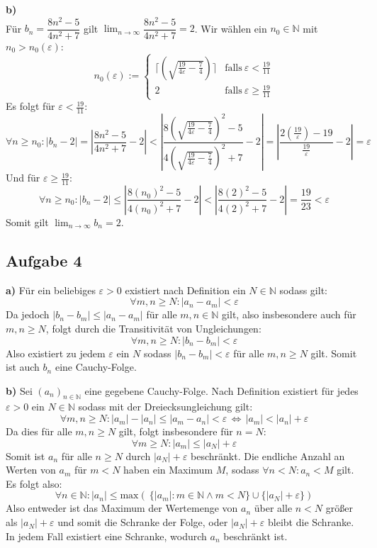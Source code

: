 \documentclass[a4paper,graphics,11pt]{article}
\newcommand{\aufgabe}[1]{\subsection*{Aufgabe #1}}
\begin{document}
\textbf{b)}\\
Für $b_n=\dfrac{8n^2-5}{4n^2+7}$ gilt $\lim_{n \to\infty}\limits \dfrac{8n^2-5}{4n^2+7}=2$.
Wir wählen ein $n_0 \in \mathbb{N}$ mit $n_0 > n_0(\varepsilon)$:
$$
    n_0(\varepsilon) := \begin{cases}
        \Big\lceil\left(\sqrt{\frac{19}{4\varepsilon} - \frac{7}{4}}\right)\Big\rceil
            & \text{falls}\ \varepsilon < \frac{19}{11}\\
        2
            & \text{falls}\ \varepsilon \geq \frac{19}{11}
    \end{cases}
$$
Es folgt für $\varepsilon < \frac{19}{11}\colon$
$$
    \forall n \geq n_0\colon \vert b_n -2\vert = \left|\frac{8n^2-5}{4n^2+7}-2\right| <
    \left|\frac{8\left(\sqrt{\frac{19}{4\varepsilon}-\frac{7}{4}} \right)^2-5}{4\left(\sqrt{\frac{19}{4\varepsilon} - \frac{7}{4}} \right)^2+7} -2\right|
    =\left|\frac{2(\frac{19}{\varepsilon})-19}{\frac{19}{\varepsilon}} -2\right| = \varepsilon
$$
Und für $\varepsilon \geq \frac{19}{11}\colon$
$$
    \forall n\geq n_0 \colon \vert b_n -2\vert \leq \left|\frac{8(n_0)^2-5}{4(n_0)^2+7}-2\right|
    < \left|\frac{8(2)^2-5}{4(2)^2+7}-2\right| = \frac{19}{23} < \varepsilon
$$
Somit gilt $\lim_{n \to \infty}\limits b_n = 2$.
\newpage
\aufgabe{4}
\textbf{a)}
Für ein beliebiges $\varepsilon > 0$ existiert nach Definition ein $N \in \mathbb{N}$ sodass
gilt:
$$
    \forall m,n \geq N\colon |a_n-a_m| < \varepsilon
$$
Da jedoch $|b_n - b_m| \leq |a_n-a_m|$ für alle $m,n \in \mathbb{N}$ gilt, also insbesondere
auch für $m,n \geq N$, folgt durch die Transitivität von Ungleichungen:
$$
    \forall m,n \geq N\colon |b_n-b_m| < \varepsilon
$$
Also existiert zu jedem $\varepsilon$ ein $N$ sodass $|b_n-b_m| < \varepsilon$ für alle
$m,n \geq N$ gilt. Somit ist auch $b_n$ eine Cauchy-Folge.


\textbf{b)}
Sei $(a_n)_{n \in \mathbb{N}}$ eine gegebene Cauchy-Folge. Nach Definition existiert
für jedes $\varepsilon >0$ ein $N \in \mathbb{N}$ sodass mit der Dreiecksungleichung gilt:
$$
    \forall m,n \geq N \colon |a_m|-|a_n|\leq|a_m-a_n| < \varepsilon 
    \,\Longleftrightarrow\, |a_m| < |a_n| + \varepsilon
$$
Da dies für alle $m,n \geq N$ gilt, folgt insbesondere für $n=N$:
$$
    \forall m \geq N \colon |a_m| \leq |a_N|+\varepsilon
$$
Somit ist $a_n$ für alle $n \geq N$ durch $|a_N|+\varepsilon$ beschränkt.
Die endliche Anzahl an Werten von $a_m$ für $m<N$ haben ein Maximum $M$, sodass $\forall n <N\colon a_n < M$ gilt. Es folgt also:
$$
    \forall n \in \mathbb{N} \colon |a_n| \leq \text{max}(\ \{|a_m|\colon m\in \mathbb{N} \land m < N\}
    \cup \{|a_N|+\varepsilon\})
$$
Also entweder ist das Maximum der Wertemenge von $a_n$ über alle $n<N$ größer als
$|a_N|+\varepsilon$ und somit die Schranke der Folge, oder $|a_N|+\varepsilon$
bleibt die Schranke. In jedem Fall existiert eine Schranke, wodurch $a_n$ beschränkt ist.
\end{document}
